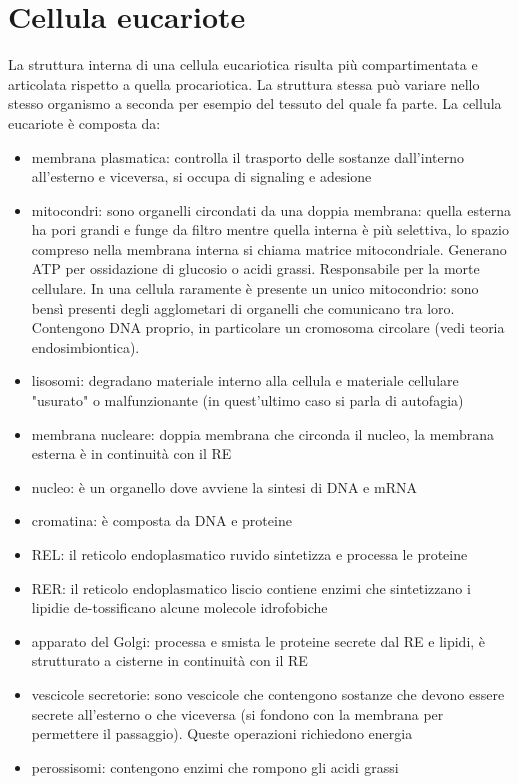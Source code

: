\section{Cellula eucariote}
La struttura interna di una cellula eucariotica risulta più compartimentata e articolata rispetto a quella procariotica. La struttura stessa può variare nello stesso organismo a seconda per esempio del tessuto del quale fa parte. La cellula eucariote è composta da:
\begin{itemize}
    \item membrana plasmatica: controlla il trasporto delle sostanze dall'interno all'esterno e viceversa, si occupa di signaling e adesione
    \item mitocondri: sono organelli circondati da una doppia membrana: quella esterna ha pori grandi e funge da filtro mentre quella interna è più selettiva, lo spazio compreso nella membrana interna si chiama matrice mitocondriale. Generano ATP per ossidazione di glucosio o acidi grassi. Responsabile per la morte cellulare. In una cellula raramente è presente un unico mitocondrio: sono bensì presenti degli agglometari di organelli che comunicano tra loro. Contengono DNA proprio, in particolare un cromosoma circolare (vedi teoria endosimbiontica).
    \item lisosomi: degradano materiale interno alla cellula e materiale cellulare "usurato" o malfunzionante (in quest'ultimo caso si parla di autofagia)
    \item membrana nucleare: doppia membrana che circonda il nucleo, la membrana esterna è in continuità con il RE
    \item nucleo: è un organello dove avviene la sintesi di DNA e mRNA
    \item cromatina: è composta da DNA e proteine
    \item REL: il reticolo endoplasmatico ruvido sintetizza e processa le proteine
    \item RER: il reticolo endoplasmatico liscio contiene enzimi che sintetizzano i lipidie de-tossificano alcune molecole idrofobiche
    \item apparato del Golgi: processa e smista le proteine secrete dal RE e lipidi, è strutturato a cisterne in continuità con il RE
    \item vescicole secretorie: sono vescicole che contengono sostanze che devono essere secrete all'esterno o che viceversa (si fondono con la membrana per permettere il passaggio). Queste operazioni richiedono energia
    \item perossisomi: contengono enzimi che rompono gli acidi grassi

\end{itemize}

